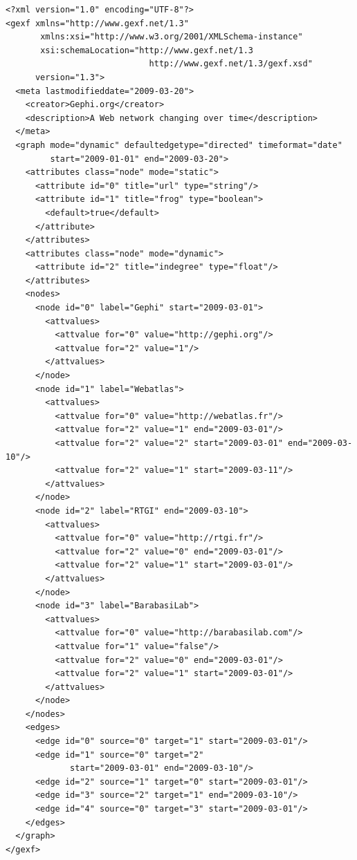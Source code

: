 \documentclass[a4paper,10pt]{article}
\begin{document}
\lstset{ style=gexf }
\begin{lstlisting}[caption={A (small) Dynamic Web Graph with continuous time},label=dynwebgraph]
<?xml version="1.0" encoding="UTF-8"?>
<gexf xmlns="http://www.gexf.net/1.3"
       xmlns:xsi="http://www.w3.org/2001/XMLSchema-instance"
       xsi:schemaLocation="http://www.gexf.net/1.3
                             http://www.gexf.net/1.3/gexf.xsd"
      version="1.3">
  <meta lastmodifieddate="2009-03-20">
    <creator>Gephi.org</creator>
    <description>A Web network changing over time</description>
  </meta>
  <graph mode="dynamic" defaultedgetype="directed" timeformat="date"
         start="2009-01-01" end="2009-03-20">
    <attributes class="node" mode="static">
      <attribute id="0" title="url" type="string"/>
      <attribute id="1" title="frog" type="boolean">
        <default>true</default>
      </attribute>
    </attributes>
    <attributes class="node" mode="dynamic">
      <attribute id="2" title="indegree" type="float"/>
    </attributes>
    <nodes>
      <node id="0" label="Gephi" start="2009-03-01">
        <attvalues>
          <attvalue for="0" value="http://gephi.org"/>
          <attvalue for="2" value="1"/>
        </attvalues>
      </node>
      <node id="1" label="Webatlas">
        <attvalues>
          <attvalue for="0" value="http://webatlas.fr"/>
          <attvalue for="2" value="1" end="2009-03-01"/>
          <attvalue for="2" value="2" start="2009-03-01" end="2009-03-10"/>
          <attvalue for="2" value="1" start="2009-03-11"/>
        </attvalues>
      </node>
      <node id="2" label="RTGI" end="2009-03-10">
        <attvalues>
          <attvalue for="0" value="http://rtgi.fr"/>
          <attvalue for="2" value="0" end="2009-03-01"/>
          <attvalue for="2" value="1" start="2009-03-01"/>
        </attvalues>
      </node>
      <node id="3" label="BarabasiLab">
        <attvalues>
          <attvalue for="0" value="http://barabasilab.com"/>
          <attvalue for="1" value="false"/>
          <attvalue for="2" value="0" end="2009-03-01"/>
          <attvalue for="2" value="1" start="2009-03-01"/>
        </attvalues>
      </node>
    </nodes>
    <edges>
      <edge id="0" source="0" target="1" start="2009-03-01"/>
      <edge id="1" source="0" target="2"
             start="2009-03-01" end="2009-03-10"/>
      <edge id="2" source="1" target="0" start="2009-03-01"/>
      <edge id="3" source="2" target="1" end="2009-03-10"/>
      <edge id="4" source="0" target="3" start="2009-03-01"/>
    </edges>
  </graph>
</gexf>
\end{lstlisting}
\end{document}
